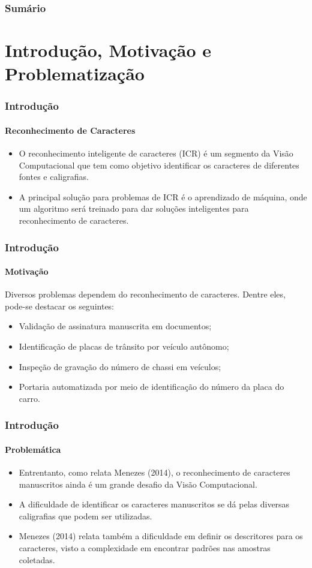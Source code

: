
	\date[2017]{19 de Julho de 2017}
	
	\begin{frame}
		\titlepage
	\end{frame}
	\begin{frame}
		\frametitle{Sum\'{a}rio}
		\tableofcontents%
	\end{frame}
	
	\section{Introdução, Motivação e Problematização}

	\begin{frame}
		\frametitle{Introdução}		
		\framesubtitle{Reconhecimento de Caracteres}		
		\begin{itemize}
			\item O reconhecimento inteligente de caracteres (ICR) é um segmento da Visão Computacional que tem como objetivo identificar os caracteres de diferentes fontes e caligrafias.
			\item A principal solução para problemas de ICR é o aprendizado de máquina, onde um algoritmo será treinado para dar soluções inteligentes para reconhecimento de caracteres.
		\end{itemize}	
	\end{frame}
	\begin{frame}
		\frametitle{Introdução}		
		\framesubtitle{Motivação}
		Diversos problemas dependem do reconhecimento de caracteres. Dentre eles, pode-se destacar os seguintes:
	 	\begin{itemize}
	 		\item Validação de assinatura manuscrita em documentos;
	 		\item Identificação de placas de trânsito por veículo autônomo;
	 		\item Inspeção de gravação do número de chassi em veículos;
	 		\item Portaria automatizada por meio de identificação do número da placa do carro.
	 	\end{itemize}
	\end{frame}
\begin{frame}
	\frametitle{Introdução}		
	\framesubtitle{Problemática}		
	\begin{itemize}
		\item Entrentanto, como relata Menezes (2014), o reconhecimento de caracteres manuscritos ainda é um grande desafio da Visão Computacional.
		\item A dificuldade de identificar os caracteres manuscritos se dá pelas diversas caligrafias que podem ser utilizadas.
		\item Menezes (2014) relata também a dificuldade em definir os descritores para os caracteres, visto a complexidade em encontrar padrões nas amostras coletadas.
	\end{itemize}	
	\end{frame}

